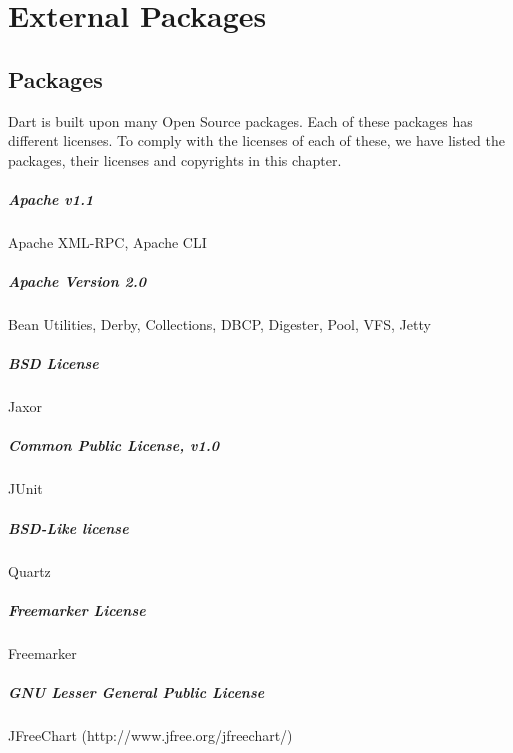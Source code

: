 \documentclass{InsightBook}
\begin{document}
\chapter{External Packages}
\section{Packages}
Dart is built upon many Open Source packages.  Each of these packages has different licenses.  To comply with the licenses of each of these, we have listed the packages, their licenses and copyrights in this chapter.

\paragraph{Apache v1.1}
Apache XML-RPC, Apache CLI

\paragraph{Apache Version 2.0}
Bean Utilities, Derby, Collections, DBCP, Digester, Pool, VFS, Jetty

\paragraph{BSD License}
Jaxor

\paragraph{Common Public License, v1.0}
JUnit

\paragraph{BSD-Like license}
Quartz 

\paragraph{Freemarker License}
Freemarker

\paragraph{GNU Lesser General Public License}
JFreeChart (http://www.jfree.org/jfreechart/)
\end{document}
